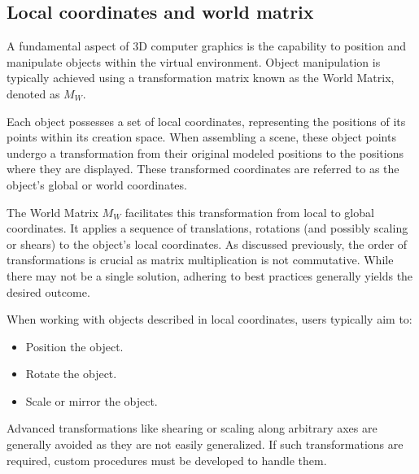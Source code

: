 \subsection{Local coordinates and world matrix}
A fundamental aspect of 3D computer graphics is the capability to position and manipulate objects within the virtual environment. 
Object manipulation is typically achieved using a transformation matrix known as the World Matrix, denoted as $M_W$.

Each object possesses a set of local coordinates, representing the positions of its points within its creation space. 
When assembling a scene, these object points undergo a transformation from their original modeled positions to the positions where they are displayed. 
These transformed coordinates are referred to as the object's global or world coordinates.

The World Matrix $M_W$ facilitates this transformation from local to global coordinates. 
It applies a sequence of translations, rotations (and possibly scaling or shears) to the object's local coordinates. 
As discussed previously, the order of transformations is crucial as matrix multiplication is not commutative. 
While there may not be a single solution, adhering to best practices generally yields the desired outcome.

When working with objects described in local coordinates, users typically aim to:
\begin{itemize}
    \item Position the object.
    \item Rotate the object.
    \item Scale or mirror the object.
\end{itemize}

Advanced transformations like shearing or scaling along arbitrary axes are generally avoided as they are not easily generalized. 
If such transformations are required, custom procedures must be developed to handle them.